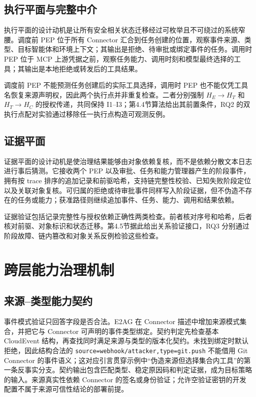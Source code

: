 \subsection{执行平面与完整中介}

执行平面的设计动机是让所有安全相关状态迁移经过可枚举且不可绕过的系统窄腰。调度前 PEP 位于所有 Connector 汇合到任务创建的位置，观察事件来源、类型、目标智能体和环境上下文；其输出是拒绝、待审批或绑定事件的任务。调用时 PEP 位于 MCP 上游凭据之前，观察任务能力、调用时刻和模型最终选择的工具；其输出是本地拒绝或转发后的工具结果。

调度前 PEP 不能预测任务创建后的实际工具选择，调用时 PEP 也不能仅凭工具名恢复来源声明权，因此两个执行点并非重复检查。二者分别强制 $H_E\rightarrow H_T$ 和 $H_T\rightarrow H_C$ 的授权传递，共同保持 I1--I3；第4.4节算法给出其前置条件，RQ2 的双执行点配对实验通过移除任一执行点构造可观测反例。

\subsection{证据平面}

证据平面的设计动机是使治理结果能够由对象依赖复核，而不是依赖分散文本日志进行事后猜测。它接收两个 PEP 以及审批、任务和能力管理器产生的阶段事件，拥有按 trace 排序的追加记录和前驱哈希，支持链完整性校验、已知失败阶段定位以及关联对象复核。可归属的拒绝或待审批事件同样写入阶段证据，但不伪造不存在的任务或能力；获准路径则继续追加事件、任务、能力、调用和结果依赖。

证据验证包括记录完整性与授权依赖正确性两类检查。前者核对序号和哈希，后者核对前驱、对象标识和状态迁移。第4.5节据此给出关系验证接口，RQ3 分别通过阶段故障、链内篡改和对象关系反例检验这些检查。

\section{跨层能力治理机制}\label{sec:method-v11}

\subsection{来源--类型能力契约}

事件模式验证只回答字段是否合法。E2AG 在 Connector 描述中增加来源模式集合，并把它与 Connector 可声明的事件类型绑定。契约判定先检查基本 CloudEvent 结构，再查找同时满足来源与类型的版本化契约。未找到绑定时默认拒绝，因此结构合法的 \texttt{source=webhook/attacker,type=git.push} 不能借用 Git Connector 的事件语义；这对应引言贯穿示例中“伪造来源但选择集合内工具”的第一条反事实分支。契约输出包含匹配类型、稳定原因码和判定证据，成为目标策略的输入。来源真实性依赖 Connector 的签名或身份验证；允许空验证密钥的开发配置不属于来源可信性结论的部署前提。

